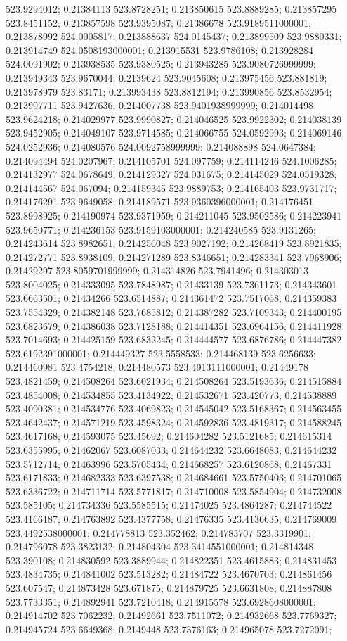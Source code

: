 523.9294012; 0.21384113 523.8728251; 0.213850615 523.8889285; 0.213857295 523.8451152; 0.213857598 523.9395087; 0.21386678 523.9189511000001; 0.213878992 524.0005817; 0.213888637 524.0145437; 0.213899509 523.9880331; 0.213914749 524.0508193000001; 0.213915531 523.9786108; 0.213928284 524.0091902; 0.213938535 523.9380525; 0.213943285 523.9080726999999; 0.213949343 523.9670044; 0.2139624 523.9045608; 0.213975456 523.881819; 0.213978979 523.83171; 0.213993438 523.8812194; 0.213990856 523.8532954; 0.213997711 523.9427636; 0.214007738 523.9401938999999; 0.214014498 523.9624218; 0.214029977 523.9990827; 0.214046525 523.9922302; 0.214038139 523.9452905; 0.214049107 523.9714585; 0.214066755 524.0592993; 0.214069146 524.0252936; 0.214080576 524.0092758999999; 0.214088898 524.0647384; 0.214094494 524.0207967; 0.214105701 524.097759; 0.214114246 524.1006285; 0.214132977 524.0678649; 0.214129327 524.031675; 0.214145029 524.0519328; 0.214144567 524.067094; 0.214159345 523.9889753; 0.214165403 523.9731717; 0.214176291 523.9649058; 0.214189571 523.9360396000001; 0.214176451 523.8998925; 0.214190974 523.9371959; 0.214211045 523.9502586; 0.214223941 523.9650771; 0.214236153 523.9159103000001; 0.214240585 523.9131265; 0.214243614 523.8982651; 0.214256048 523.9027192; 0.214268419 523.8921835; 0.214272771 523.8938109; 0.214271289 523.8346651; 0.214283341 523.7968906; 0.21429297 523.8059701999999; 0.214314826 523.7941496; 0.214303013 523.8004025; 0.214333095 523.7848987; 0.21433139 523.7361173; 0.214343601 523.6663501; 0.21434266 523.6514887; 0.214361472 523.7517068; 0.214359383 523.7554329; 0.214382148 523.7685812; 0.214387282 523.7109343; 0.214400195 523.6823679; 0.214386038 523.7128188; 0.214414351 523.6964156; 0.214411928 523.7014693; 0.214425159 523.6832245; 0.214444577 523.6876786; 0.214447382 523.6192391000001; 0.214449327 523.5558533; 0.214468139 523.6256633; 0.214460981 523.4754218; 0.214480573 523.4913111000001; 0.21449178 523.4821459; 0.214508264 523.6021934; 0.214508264 523.5193636; 0.214515884 523.4854008; 0.214534855 523.4134922; 0.214532671 523.420773; 0.214538889 523.4090381; 0.214534776 523.4069823; 0.214545042 523.5168367; 0.214563455 523.4642437; 0.214571219 523.4598324; 0.214592836 523.4819317; 0.214588245 523.4617168; 0.214593075 523.45692; 0.214604282 523.5121685; 0.214615314 523.6355995; 0.21462067 523.6087033; 0.214644232 523.6648083; 0.214644232 523.5712714; 0.21463996 523.5705434; 0.214668257 523.6120868; 0.21467331 523.6171833; 0.214682333 523.6397538; 0.214684661 523.5750403; 0.214701065 523.6336722; 0.214711714 523.5771817; 0.214710008 523.5854904; 0.214732008 523.585105; 0.214734336 523.5585515; 0.21474025 523.4864287; 0.214744522 523.4166187; 0.214763892 523.4377758; 0.21476335 523.4136635; 0.214769009 523.4492538000001; 0.214778813 523.352462; 0.214783707 523.3319901; 0.214796078 523.3823132; 0.214804304 523.3414551000001; 0.214814348 523.390108; 0.214830592 523.3889944; 0.214822351 523.4615883; 0.214831453 523.4834735; 0.214841002 523.513282; 0.21484722 523.4670703; 0.214861456 523.607547; 0.214873428 523.671875; 0.214879725 523.6631808; 0.214887808 523.7733351; 0.214892941 523.7210418; 0.214915578 523.6928608000001; 0.214914702 523.7062232; 0.21492661 523.7511072; 0.214932668 523.7769327; 0.214945724 523.6649368; 0.2149448 523.7376163; 0.214965078 523.7272091; 
